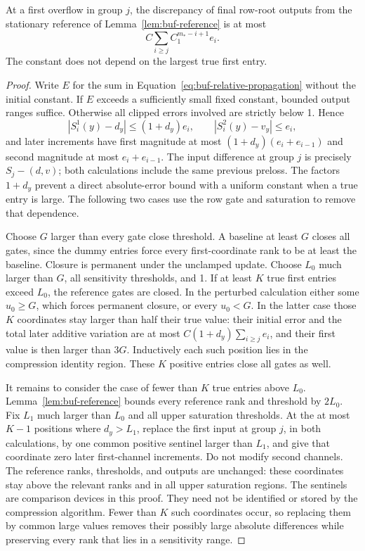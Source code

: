 \begin{lemma}
\label{lem:buf-relative-stability}
At a first overflow in group $j$, the discrepancy of final row-root outputs
from the stationary reference of Lemma~\ref{lem:buf-reference} is at most
\begin{equation}
 C\sum_{i\geq j} C_1^{m_*-i+1}e_i.
 \label{eq:buf-relative-propagation}
\end{equation}
The constant does not depend on the largest true first entry.
\end{lemma}
\begin{proof}
Write $E$ for the sum in Equation~\eqref{eq:buf-relative-propagation}
without the initial constant.  If $E$ exceeds a sufficiently small fixed
constant, bounded output ranges suffice.  Otherwise all clipped errors
involved are strictly below 1.  Hence
\[
 |S_i^1(y)-d_y|\leq(1+d_y)e_i,
 \qquad |S_i^2(y)-v_y|\leq e_i,
\]
and later increments have first magnitude at most
$(1+d_y)(e_i+e_{i-1})$ and second magnitude at most $e_i+e_{i-1}$.
The input difference at group $j$ is precisely $S_j-(d,v)$; both
calculations include the same previous preloss.
The factors $1+d_y$ prevent a direct absolute-error bound with a uniform
constant when a true entry is large.  The following two cases use the
row gate and saturation to remove that dependence.

Choose $G$ larger than every gate close threshold.  A baseline at least
$G$ closes all gates, since the dummy entries force every first-coordinate
rank to be at least the baseline.  Closure is permanent under the
unclamped update.  Choose $L_0$ much larger than $G$, all sensitivity
thresholds, and 1.  If at least $K$ true first entries exceed $L_0$, the
reference gates are closed.  In the perturbed calculation either some
$u_0\geq G$, which forces permanent closure, or every $u_0<G$.
In the latter case those $K$ coordinates stay larger than half their
true value: their initial error and the total later additive variation
are at most $C(1+d_y)\sum_{i\geq j}e_i$, and their first value is then
larger than $3G$.  Inductively each such position lies in the compression
identity region.  These $K$ positive entries close all gates as well.

It remains to consider the case of fewer than $K$ true entries above
$L_0$.  Lemma~\ref{lem:buf-reference} bounds every reference rank and
threshold by $2L_0$.  Fix $L_1$ much larger than $L_0$ and all upper
saturation thresholds.  At the at most $K-1$ positions where $d_y>L_1$,
replace the first input at group $j$, in both calculations, by one common
positive sentinel larger than $L_1$, and give that coordinate zero later
first-channel increments.  Do not modify second channels.
The reference ranks, thresholds, and outputs are unchanged: these
coordinates stay above the relevant ranks and in all upper saturation
regions.
The sentinels are comparison devices in this proof.  They need not be
identified or stored by the compression algorithm.  Fewer than $K$ such
coordinates occur, so replacing them by common large values removes
their possibly large absolute differences while preserving every rank
that lies in a sensitivity range.


\end{proof}
